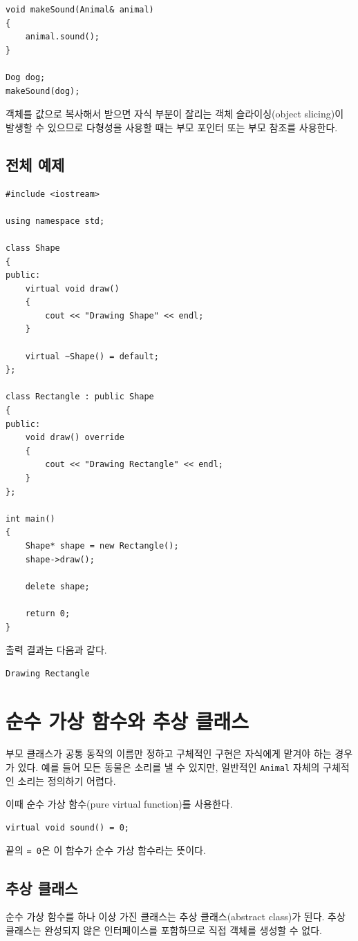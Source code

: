 \documentclass[11pt,a4paper]{article}
\begin{document}
\begin{lstlisting}
void makeSound(Animal& animal)
{
    animal.sound();
}

Dog dog;
makeSound(dog);
\end{lstlisting}

객체를 값으로 복사해서 받으면 자식 부분이 잘리는 객체 슬라이싱(object slicing)이 발생할 수 있으므로 다형성을 사용할 때는 부모 포인터 또는 부모 참조를 사용한다.

\subsection{전체 예제}
\begin{lstlisting}
#include <iostream>

using namespace std;

class Shape
{
public:
    virtual void draw()
    {
        cout << "Drawing Shape" << endl;
    }

    virtual ~Shape() = default;
};

class Rectangle : public Shape
{
public:
    void draw() override
    {
        cout << "Drawing Rectangle" << endl;
    }
};

int main()
{
    Shape* shape = new Rectangle();
    shape->draw();

    delete shape;

    return 0;
}
\end{lstlisting}

출력 결과는 다음과 같다.

\begin{verbatim}
Drawing Rectangle
\end{verbatim}

\section{순수 가상 함수와 추상 클래스}
부모 클래스가 공통 동작의 이름만 정하고 구체적인 구현은 자식에게 맡겨야 하는 경우가 있다. 예를 들어 모든 동물은 소리를 낼 수 있지만, 일반적인 \texttt{Animal} 자체의 구체적인 소리는 정의하기 어렵다.

이때 순수 가상 함수(pure virtual function)를 사용한다.

\begin{lstlisting}
virtual void sound() = 0;
\end{lstlisting}

끝의 \texttt{= 0}은 이 함수가 순수 가상 함수라는 뜻이다.

\subsection{추상 클래스}
순수 가상 함수를 하나 이상 가진 클래스는 추상 클래스(abstract class)가 된다. 추상 클래스는 완성되지 않은 인터페이스를 포함하므로 직접 객체를 생성할 수 없다.
\end{document}
